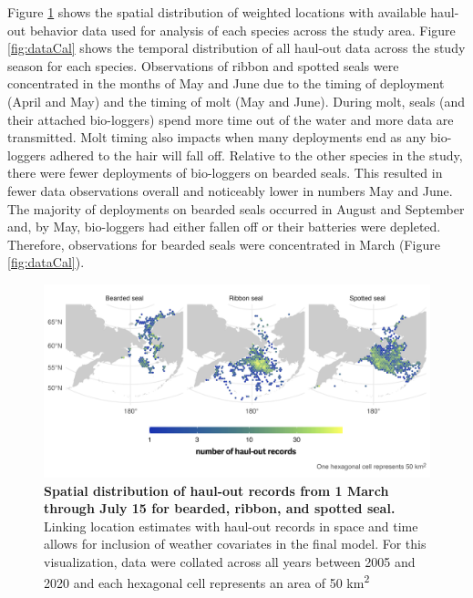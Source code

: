 \documentclass[fleqn,10pt,lineno]{wlpeerj} %
\begin{document}
Figure \ref{fig:dataMap} shows the spatial distribution of weighted locations
with available haul-out behavior data used for analysis of each species across
the study area. Figure \ref{fig:dataCal} shows the temporal distribution of all
haul-out data across the study season for each species. Observations of ribbon
and spotted seals were concentrated in the months of May and June due to the
timing of deployment (April and May) and the timing of molt (May and June).
During molt, seals (and their attached bio-loggers) spend more time out of the
water and more data are transmitted. Molt timing also impacts when many
deployments end as any bio-loggers adhered to the hair will fall off. Relative
to the other species in the study, there were fewer deployments of bio-loggers
on bearded seals. This resulted in fewer data observations overall and
noticeably lower in numbers May and June. The majority of deployments on bearded
seals occurred in August and September and, by May, bio-loggers had either
fallen off or their batteries were depleted. Therefore, observations for bearded
seals were concentrated in March (Figure \ref{fig:dataCal}).



\begin{figure}
\includegraphics[width=1\linewidth]{../figures/dataMap-1} \caption{\textbf{Spatial distribution of haul-out records from 1 March through July 15 for bearded, ribbon, and spotted seal.} \linebreak Linking location estimates with haul-out records in space and time allows for inclusion of weather covariates in the final model. For this visualization, data were collated across all years between 2005 and 2020 and each hexagonal cell represents an area of 50 km\textsuperscript{2}}\label{fig:dataMap}
\end{figure}
\end{document}
